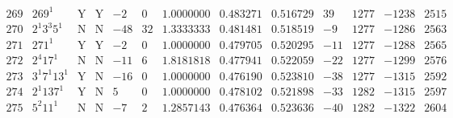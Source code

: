 \documentclass[11pt,reqno,a4letter]{article}
\numberwithin{equation}{section}
\numberwithin{figure}{section}
\numberwithin{table}{section}
\theoremstyle{plain}
\numberwithin{theorem}{section}
\theoremstyle{definition}
\begin{document}
\begin{table}[ht]
\begin{equation*}
{\begin{array}{cc|cc|ccc|cc|cccc}
 269 & 269^1 & \text{Y} & \text{Y} & -2 & 0 & 1.0000000 & 0.483271 & 0.516729 & 39 & 1277 & -1238 & 2515 \\
 270 & 2^1 3^3 5^1 & \text{N} & \text{N} & -48 & 32 & 1.3333333 & 0.481481 & 0.518519 & -9 & 1277 & -1286 & 2563 \\
 271 & 271^1 & \text{Y} & \text{Y} & -2 & 0 & 1.0000000 & 0.479705 & 0.520295 & -11 & 1277 & -1288 & 2565 \\
 272 & 2^4 17^1 & \text{N} & \text{N} & -11 & 6 & 1.8181818 & 0.477941 & 0.522059 & -22 & 1277 & -1299 & 2576 \\
 273 & 3^1 7^1 13^1 & \text{Y} & \text{N} & -16 & 0 & 1.0000000 & 0.476190 & 0.523810 & -38 & 1277 & -1315 & 2592 \\
 274 & 2^1 137^1 & \text{Y} & \text{N} & 5 & 0 & 1.0000000 & 0.478102 & 0.521898 & -33 & 1282 & -1315 & 2597 \\
 275 & 5^2 11^1 & \text{N} & \text{N} & -7 & 2 & 1.2857143 & 0.476364 & 0.523636 & -40 & 1282 & -1322 & 2604 \\
\end{array}
}
\end{equation*}
\clearpage 

\end{table} 
\end{document}
